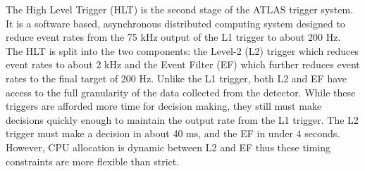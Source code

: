 The High Level Trigger (HLT) is the second stage of the ATLAS trigger system. It is a software based, asynchronous distributed computing system designed to reduce event rates from the 75 kHz output of the L1 trigger to about 200 Hz. The HLT is split into the two components: the Level-2 (L2) trigger which reduces event rates to about 2 kHz and the Event Filter (EF) which further reduces event rates to the final target of 200 Hz. Unlike the L1 trigger, both L2 and EF have access to the full granularity of the data collected from the detector. While these triggers are afforded more time for decision making, they still must make decisions quickly enough to maintain the output rate from the L1 trigger. The L2 trigger must make a decision in about 40 ms, and the EF in under 4 seconds. However, CPU allocation is dynamic between L2 and EF thus these timing constraints are more flexible than strict. 